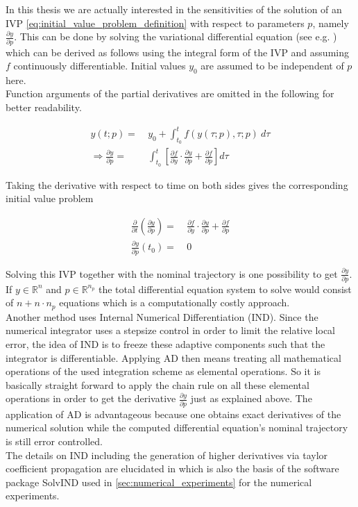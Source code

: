 \documentclass{scrartcl}[12pt, halfparskip]
\numberwithin{equation}{section}
\numberwithin{figure}{section}
\numberwithin{table}{section}
\begin{document}
In this thesis we are actually interested in the sensitivities of the solution of an IVP \cref{eq:initial_value_problem_definition} with respect to parameters $p$, namely $\frac{\partial y}{\partial p}$. 
This can be done by solving the variational differential equation (see e.g. \cite{diff_equations_numerics}) which can be derived as follows using the integral form of the IVP and assuming $f$ continuously differentiable. Initial values $y_0$ are assumed to be independent of $p$ here. \\

Function arguments of the partial derivatives are omitted in the following for better readability.

\begin{align}
	y(t;p) = \ & y_0 + \int_{t_0}^{t} f(y(\tau;p),\tau;p) \ d\tau \\
	\Rightarrow \frac{\partial y}{\partial p} = & \int_{t_0}^{t} \left[ \frac{\partial f}{\partial y} \cdot \frac{\partial y}{\partial p} + \frac{\partial f}{\partial p} \right] d\tau \nonumber
\end{align}

Taking the derivative with respect to time on both sides gives the corresponding initial value problem

\begin{align}
	\frac{\partial}{\partial t} \left( \frac{\partial y}{\partial p} \right) = \ & \frac{\partial f}{\partial y} \cdot \frac{\partial y}{\partial p} + \frac{\partial f}{\partial p} \\
	\frac{\partial y}{\partial p}(t_0) = \ & 0 \nonumber
\end{align}

Solving this IVP together with the nominal trajectory is one possibility to get $\frac{\partial y}{\partial p}$. If $y \in \mathbb{R}^n$ and $p \in \mathbb{R}^{n_p}$ the total differential equation system to solve would consist of $n + n \cdot n_p$ equations which is a computationally costly approach. \\
Another method uses Internal Numerical Differentiation (IND). Since the numerical integrator uses a stepsize control in order to limit the relative local error, the idea of IND is to freeze these adaptive components such that the integrator is differentiable. 
Applying AD then means treating all mathematical operations of the used integration scheme as elemental operations. So it is basically straight forward to apply the chain rule on all these elemental operations in order to get the derivative $\frac{\partial y}{\partial p}$ just as explained above. 
The application of AD is advantageous because one obtains exact derivatives of the numerical solution while the computed differential equation's nominal trajectory is still error controlled. \\
The details on IND including the generation of higher derivatives via taylor coefficient propagation are elucidated in \cite{diss_jan} which is also the basis of the software package SolvIND used in \cref{sec:numerical_experiments} for the numerical experiments.
\end{document}

